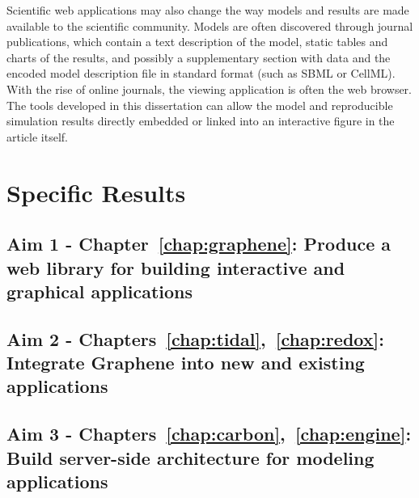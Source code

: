 Scientific web applications may also change the way models and results are made available to the scientific community.
Models are often discovered through journal publications, which contain a text description of the model, static tables and charts of the results, and possibly a supplementary section with data and the encoded model description file in standard format (such as SBML or CellML).
With the rise of online journals, the viewing application is often the web browser.
The tools developed in this dissertation can allow the model and reproducible simulation results directly embedded or linked into an interactive figure in the article itself.

\section{Specific Results}
\subsection{Aim 1 - Chapter~\ref{chap:graphene}: Produce a web library for building interactive and graphical applications}
\subsection{Aim 2 - Chapters~\ref{chap:tidal},~\ref{chap:redox}: Integrate Graphene into new and existing applications}
\subsection{Aim 3 - Chapters~\ref{chap:carbon},~\ref{chap:engine}: Build server-side architecture for modeling applications}

